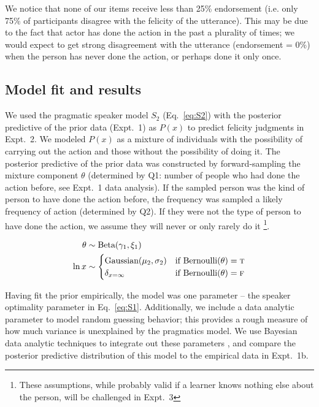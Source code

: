 \documentclass[10pt,letterpaper]{article}
\begin{document}
We notice that none of our items receive less than 25\% endorsement (i.e. only 75\% of participants disagree with the felicity of the utterance).
This may be due to the fact that actor has done the action in the past a plurality of times; we would expect to get strong disagreement with the utterance (endorsement = 0\%) when the person has never done the action, or perhaps done it only once.

\subsection{Model fit and results}

We used the pragmatic speaker model $S_2$ (Eq.~\ref{eq:S2}) with the posterior predictive of the prior data (Expt.~1) as $P(x)$  to predict felicity judgments in Expt.~2.
We modeled $P(x)$ as a mixture of individuals with the possibility of carrying out the action and those without the possibility of doing it. 
The posterior predictive of the prior data was constructed by forward-sampling the mixture component $\theta$ (determined by Q1: number of people who had done the action before, see Expt.~1 data analysis).
If the sampled person was the kind of person to have done the action before, the frequency was sampled a likely frequency of action (determined by Q2). 
If they were not the type of person to have done the action, we assume they will never or only rarely do it
\footnote{These assumptions, while probably valid if a learner knows nothing else about the person, will be challenged in Expt.~3}.

\begin{minipage}{0.5 \textwidth} \small
\begin{align*}
\theta & \sim \text{Beta}(\gamma_{1}, \xi_{1}) \\ 
\ln x & \sim \begin{cases} 
		\text{Gaussian}(\mu_{2}, \sigma_{2}) &\mbox{if } \text{Bernoulli}(\theta) = \textsc{t} \\
				\delta_{x=\infty} &\mbox{if } \text{Bernoulli}(\theta) = \textsc{f} \\
		\end{cases} \\
\end{align*}
\end{minipage}

Having fit the prior empirically, the model was one parameter -- the speaker optimality parameter in Eq.~\ref{eq:S1}. 
Additionally, we include a data analytic parameter to model random guessing behavior; this provides a rough measure of how much variance is unexplained by the pragmatics model. 
We use Bayesian data analytic techniques to integrate out these parameters \cite{LW2014}, and compare the posterior predictive distribution of this model to the empirical data in Expt.~1b.
\end{document}
